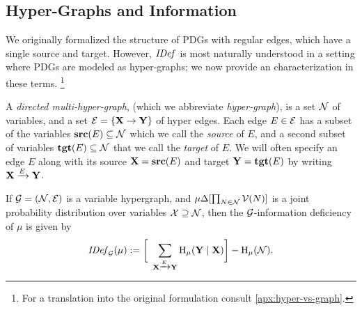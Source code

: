\documentclass{article}
\begin{document}
    \subsection{Hyper-Graphs and Information}
    We originally formalized the structure of PDGs with regular edges, which have a single source and target. However, $\mathit{IDef}_{}$ is most naturally understood in a setting where PDGs are modeled as hyper-graphs; we now provide an characterization in these terms.%
        \footnote{For a translation into the original formulation consult \cref{apx:hyper-vs-graph}.}
    \begin{defn} \label{defn:hypergraph}
        A \emph{directed multi-hyper-graph}, (which we abbreviate \emph{hyper-graph}), is a set $\mathcal N$ of variables, and a set $\mathcal E = \{ \mathbf X \to \mathbf Y \}$ of hyper edges. Each edge $E \in \mathcal E$ has a subset of the variables $\mathbf{src}(E) \subseteq \mathcal N$ which we call the \emph{source} of $E$, and a second subset of variables $\mathbf{tgt}(E) \subseteq \mathcal N$ that we call the \emph{target} of $E$. We will often specify an edge $E$ along with its source $\mathbf X = \mathbf{src}(E)$ and target $\mathbf Y = \mathbf{tgt}(E)$ by writing $\ed E{\mat X}{\mat Y}$.
    \end{defn}

    \begin{defn} \label{defn:idef}
        If $\mathcal G = (\mathcal N, \mathcal E)$ is a variable hypergraph, and $\mu {\Delta [ \prod_{N\in\mathcal N}\mathcal V(N)]}$ is a joint probability distribution over variables $\mathcal X \supseteq \mathcal N$, then the $\mathcal G$-information deficiency of $\mu$ is given by
        \begin{equation}
            \IDef{\Gr}(\mu) := \bigg[~\sum_{\ed E{\mat X}{\mat Y}} \H_\mu(\mat Y\mid \mat X)\bigg] - \H_\mu(\N).
            \label{eq:idef}
        \end{equation}
    \end{defn}

\end{document}
